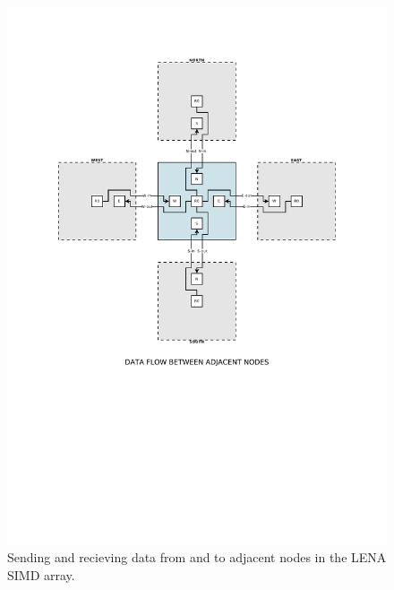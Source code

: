 \begin{figure}[h]
  \centering
  \includegraphics[width=\linewidth,clip,trim=0 0 0 0]
                  {fig/fpga/fpga-simd-send}
  \caption[Sending data]{Sending and recieving data from and to adjacent nodes in the \ac{LENA} \ac{SIMD} array.}
  \label{fig:fpga-simd-send}
\end{figure}

